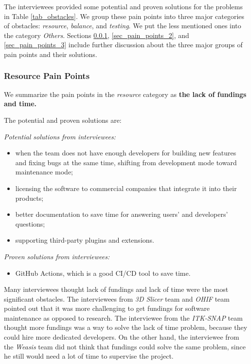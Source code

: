 \documentclass[final, 3p, times, authoryear]{elsarticle}
\begin{document}
The interviewees provided some potential and proven solutions for the problems
in Table \ref{tab_obstacles}. We group these pain points into three major
categories of obstacles: \textit{resource}, \textit{balance}, and
\textit{testing}. We put the less mentioned ones into the category
\textit{Others}. Sections \ref{sec_pain_points_1}, \ref{sec_pain_points_2}, and
\ref{sec_pain_points_3} include further discussion about the three major groups
of pain points and their solutions.

\subsubsection{Resource Pain Points} \label{sec_pain_points_1}

We summarize the pain points in the \textit{resource} category as
\textbf{the lack of fundings and time.}

The potential and proven solutions are:

\noindent\textit{Potential solutions from interviewees:}
\begin{itemize}
\item when the team does not have enough developers for building new features
and fixing bugs at the same time, shifting from development mode toward
maintenance mode;
\item licensing the software to commercial companies that integrate it into
their products;
\item better documentation to save time for answering users' and developers'
questions;
\item supporting third-party plugins and extensions.
\end{itemize}

\noindent\textit{Proven solutions from interviewees:}

\begin{itemize}
\item GitHub Actions, which is a good CI/CD tool to save time.
\end{itemize}

Many interviewees thought lack of fundings and lack of time were the most
significant obstacles. The interviewees from \textit{3D Slicer} team and
\textit{OHIF} team pointed out that it was more challenging to get fundings for
software maintenance as opposed to research. The interviewee from the
\textit{ITK-SNAP} team thought more fundings was a way to solve the lack of time
problem, because they could hire more dedicated developers. On the other hand,
the interviewee from the \textit{Weasis} team did not think that fundings could
solve the same problem, since he still would need a lot of time to supervise the
project.
\end{document}
